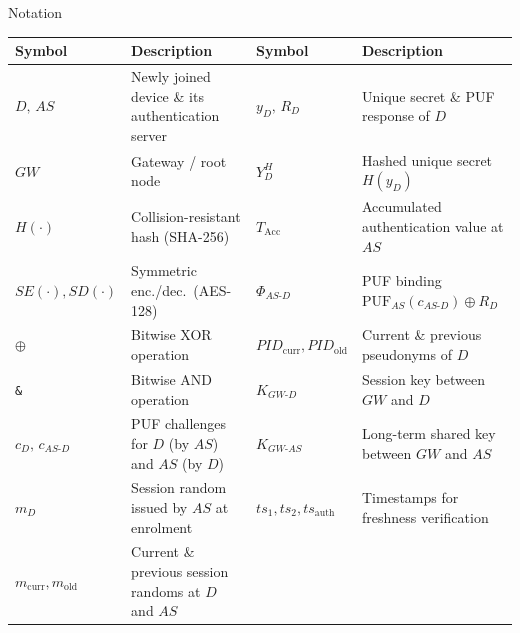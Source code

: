 \begin{frame}{Notation}
    \centering
    \scriptsize
    \setlength{\tabcolsep}{3pt}
    \renewcommand{\arraystretch}{1.25}
    \begin{tabular}{@{}l@{\ }p{}l@{\ }p{}@{}}
        \toprule
        \textbf{Symbol} & \textbf{Description} & \textbf{Symbol} & \textbf{Description} \\
        \midrule
        $D,\,AS$ & Newly joined device \& its authentication server
            & $y_D,\,R_D$ & Unique secret \& PUF response of $D$ \\
        $GW$ & Gateway / root node
            & $Y_D^{H}$ & Hashed unique secret $H(y_D)$ \\
        $H(\cdot)$ & Collision-resistant hash (SHA-256)
            & $T_{\mathrm{Acc}}$ & Accumulated authentication value at $AS$ \\
        $SE(\cdot),SD(\cdot)$ & Symmetric enc./dec.\ (AES-128)
            & $\Phi_{AS\text{-}D}$ & PUF binding $\mathrm{PUF}_{AS}(c_{AS\text{-}D})\oplus R_D$ \\
        $\oplus$ & Bitwise XOR operation
            & $\mathit{PID}_{\mathrm{curr}},\mathit{PID}_{\mathrm{old}}$ & Current \& previous pseudonyms of $D$ \\
        \texttt{\&} & Bitwise AND operation
            & $K_{GW\text{-}D}$ & Session key between $GW$ and $D$ \\
        $c_D,\,c_{AS\text{-}D}$ & PUF challenges for $D$ (by $AS$) and $AS$ (by $D$)
            & $K_{GW\text{-}AS}$ & Long-term shared key between $GW$ and $AS$ \\
        $m_D$ & Session random issued by $AS$ at enrolment
            & $ts_1,ts_2,ts_{\mathrm{auth}}$ & Timestamps for freshness verification \\
        $m_{\mathrm{curr}},m_{\mathrm{old}}$ & Current \& previous session randoms at $D$ and $AS$
            & & \\
        \bottomrule
    \end{tabular}
\end{frame}

